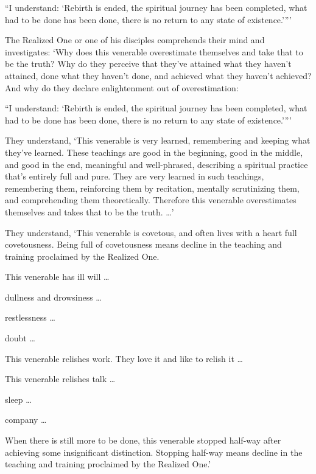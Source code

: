 \documentclass[12pt,openany]{book}%
\begin{document}
“I understand: ‘Rebirth is ended, the spiritual journey has been completed, what had to be done has been done, there is no return to any state of existence.’”’ 

The Realized One or one of his disciples comprehends their mind and investigates: ‘Why does this venerable overestimate themselves and take that to be the truth? Why do they perceive that they’ve attained what they haven’t attained, done what they haven’t done, and achieved what they haven’t achieved? And why do they declare enlightenment out of overestimation: 

“I understand: ‘Rebirth is ended, the spiritual journey has been completed, what had to be done has been done, there is no return to any state of existence.’”’ 

They understand, ‘This venerable is very learned, remembering and keeping what they’ve learned. These teachings are good in the beginning, good in the middle, and good in the end, meaningful and well-phrased, describing a spiritual practice that’s entirely full and pure. They are very learned in such teachings, remembering them, reinforcing them by recitation, mentally scrutinizing them, and comprehending them theoretically. Therefore this venerable overestimates themselves and takes that to be the truth. …’ 

They understand, ‘This venerable is covetous, and often lives with a heart full covetousness. Being full of covetousness means decline in the teaching and training proclaimed by the Realized One. 

This venerable has ill will … 

dullness and drowsiness … 

restlessness … 

doubt … 

This venerable relishes work. They love it and like to relish it … 

This venerable relishes talk … 

sleep … 

company … 

When there is still more to be done, this venerable stopped half-way after achieving some insignificant distinction. Stopping half-way means decline in the teaching and training proclaimed by the Realized One.’ 
\end{document}
